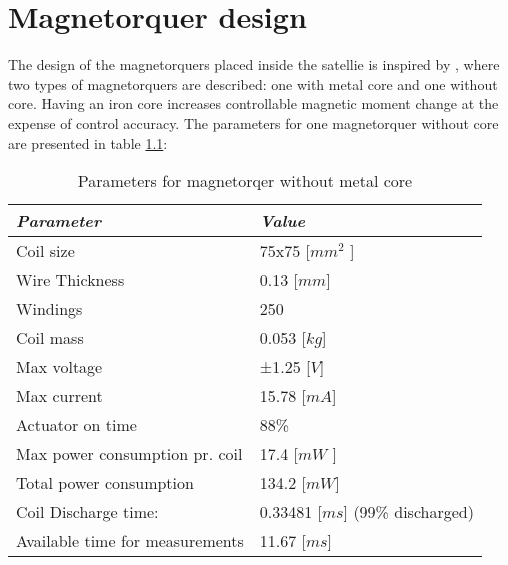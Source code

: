 \chapter{Magnetorquer design} \label{chap:F}
The design of the magnetorquers placed inside the satellie is inspired by \cite{TH}, where two types of magnetorquers are described: one with metal core and one without core. Having an iron core increases controllable magnetic moment change at the expense of control accuracy.  The parameters for one magnetorquer without core are presented in table \ref{table:for}:

\begin{table}[H]
	\centering
	\begin{tabular}{|l|l|}
		\hline
		\textit{\textbf{Parameter}}     & \textit{\textbf{Value}}                     				     \\ \hline
		Coil size                       		   & 75x75 {[}$mm^2$ {]}                      					  \\ \hline
		Wire Thickness                      & 0.13 {[}$mm${]}                             					 	\\ \hline
		Windings                        		& 250                                          						     	 \\ \hline
		Coil mass                     		    & 0.053 [$kg$]                                    					    \\ \hline
		Max voltage                  	      & ±1.25 {[}$V${]}  		\\ \hline
		Max current                  	      & 15.78 {[}$mA${]}                               						   \\ \hline
		Actuator on time                   & 88\%                                      				                        \\ \hline
		Max power consumption pr. coil  & 17.4 {[}$mW$ {]}                            					     \\ \hline
		Total power consumption     & 134.2 {[}$mW${]}                           	  					   	    \\ \hline
		Coil Discharge time:             & 0.33481 {[}$ms${]} (99\% discharged)   					     \\ \hline
		Available time for measurements & 11.67 {[}$ms${]}                               					     \\ \hline
	\end{tabular}
	\caption{Parameters for magnetorqer without metal core}
	\label{table:for}
\end{table}


